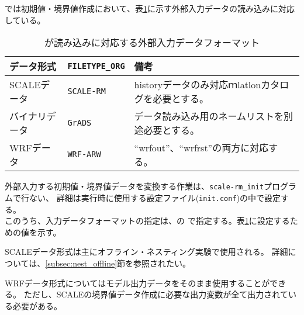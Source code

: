 \section{\SecAdvanceInputDataSetting} \label{sec:adv_datainput}

\scalerm では初期値・境界値作成において、表\ref{tab:inputdata_format}に示す外部入力データの読み込みに対応している。

\begin{table}[htb]
\begin{center}
\caption{\scalelib が読み込みに対応する外部入力データフォーマット}
\begin{tabularx}{150mm}{|l|l|X|} \hline
 \rowcolor[gray]{0.9} データ形式      & \verb|FILETYPE_ORG|  & 備考 \\ \hline
 SCALEデータ   & \verb|SCALE-RM|     & historyデータのみ対応ｍlatlonカタログを必要とする。 \\ \hline
 バイナリデータ & \verb|GrADS|        & データ読み込み用のネームリストを別途必要とする。       \\ \hline
 WRFデータ     & \verb|WRF-ARW|      & ``wrfout''、``wrfrst''の両方に対応する。          \\ \hline
\end{tabularx}
\label{tab:inputdata_format}
\end{center}
\end{table}


外部入力する初期値・境界値データを変換する作業は、\verb|scale-rm_init|プログラムで行ない、
詳細は実行時に使用する設定ファイル(\verb|init.conf|)の中で設定する。\\
このうち、入力データフォーマットの指定は、の
で指定する。表\ref{tab:inputdata_format}に設定するための値を示す。

SCALEデータ形式は主にオフライン・ネスティング実験で使用される。
詳細については、\ref{subsec:nest_offline}節を参照されたい。


WRFデータ形式についてはモデル出力データをそのまま使用することができる。
ただし、SCALEの境界値データ作成に必要な出力変数が全て出力されている必要がある。


